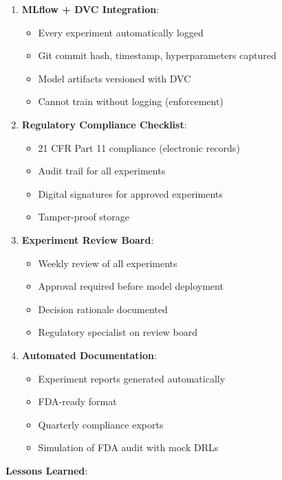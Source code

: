 \begin{enumerate}
    \item \textbf{MLflow + DVC Integration}:
    \begin{itemize}
        \item Every experiment automatically logged
        \item Git commit hash, timestamp, hyperparameters captured
        \item Model artifacts versioned with DVC
        \item Cannot train without logging (enforcement)
    \end{itemize}

    \item \textbf{Regulatory Compliance Checklist}:
    \begin{itemize}
        \item 21 CFR Part 11 compliance (electronic records)
        \item Audit trail for all experiments
        \item Digital signatures for approved experiments
        \item Tamper-proof storage
    \end{itemize}

    \item \textbf{Experiment Review Board}:
    \begin{itemize}
        \item Weekly review of all experiments
        \item Approval required before model deployment
        \item Decision rationale documented
        \item Regulatory specialist on review board
    \end{itemize}

    \item \textbf{Automated Documentation}:
    \begin{itemize}
        \item Experiment reports generated automatically
        \item FDA-ready format
        \item Quarterly compliance exports
        \item Simulation of FDA audit with mock DRLs
    \end{itemize}
\end{enumerate}

\textbf{Lessons Learned}:

